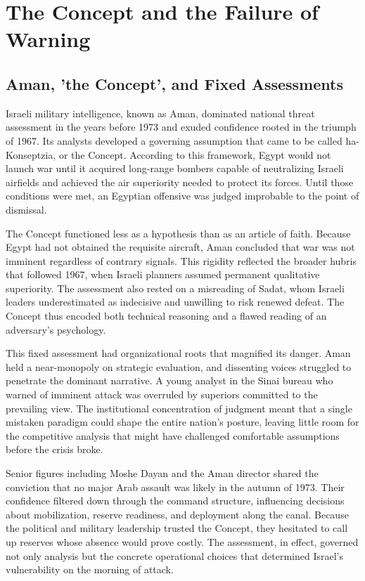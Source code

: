 \section{The Concept and the Failure of Warning}

\subsection{Aman, 'the Concept', and Fixed Assessments}
Israeli military intelligence, known as Aman, dominated national threat assessment in the years before 1973 and exuded confidence rooted in the triumph of 1967. Its analysts developed a governing assumption that came to be called ha-Konseptzia, or the Concept. According to this framework, Egypt would not launch war until it acquired long-range bombers capable of neutralizing Israeli airfields and achieved the air superiority needed to protect its forces. Until those conditions were met, an Egyptian offensive was judged improbable to the point of dismissal.

The Concept functioned less as a hypothesis than as an article of faith. Because Egypt had not obtained the requisite aircraft, Aman concluded that war was not imminent regardless of contrary signals. This rigidity reflected the broader hubris that followed 1967, when Israeli planners assumed permanent qualitative superiority. The assessment also rested on a misreading of Sadat, whom Israeli leaders underestimated as indecisive and unwilling to risk renewed defeat. The Concept thus encoded both technical reasoning and a flawed reading of an adversary's psychology.

This fixed assessment had organizational roots that magnified its danger. Aman held a near-monopoly on strategic evaluation, and dissenting voices struggled to penetrate the dominant narrative. A young analyst in the Sinai bureau who warned of imminent attack was overruled by superiors committed to the prevailing view. The institutional concentration of judgment meant that a single mistaken paradigm could shape the entire nation's posture, leaving little room for the competitive analysis that might have challenged comfortable assumptions before the crisis broke.

Senior figures including Moshe Dayan and the Aman director shared the conviction that no major Arab assault was likely in the autumn of 1973. Their confidence filtered down through the command structure, influencing decisions about mobilization, reserve readiness, and deployment along the canal. Because the political and military leadership trusted the Concept, they hesitated to call up reserves whose absence would prove costly. The assessment, in effect, governed not only analysis but the concrete operational choices that determined Israel's vulnerability on the morning of attack.

